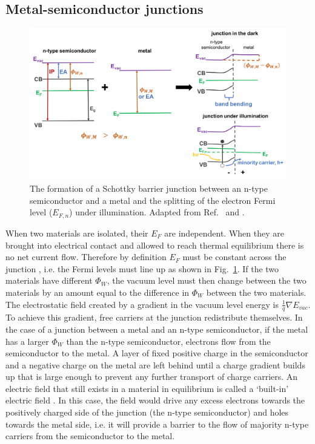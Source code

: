 \documentclass[11pt, twoside]{report}
\begin{document}
\subsection{Metal-semiconductor junctions}
\begin{figure}[h!]
  \centering
    \includegraphics[width=1.0\textwidth]{figures/schottky_schematic.png}
    \caption[The formation of a Schottky barrier junction between an n-type semiconductor and a metal and the splitting of the electron Fermi level ($E_{F,n}$) under illumination]{The formation of a Schottky barrier junction between an n-type semiconductor and a metal and the splitting of the electron Fermi level ($E_{F,n}$) under illumination. Adapted from Ref.~ and .}
  \label{schottky_schematic}
\end{figure}

When two materials are isolated, their $E_F$ are independent. When they are brought into electrical contact and allowed to reach thermal equilibrium there is no net current flow. Therefore by definition $E_F$ must be constant across the junction \cite{PV_bands_book}, i.e. the Fermi levels must line up as shown in Fig.~\ref{schottky_schematic}. 
If the two materials have different $\Phi_W$, the vacuum level must then change between the two materials by an amount equal to the difference in $\Phi_W$ between the two materials. The electrostatic field created by a gradient in the vacuum level energy is $\frac{1}{q} \nabla E_{vac}$.
To achieve this gradient, free carriers at the junction redistribute themselves. In the case of a junction between a metal and an n-type semiconductor, if the metal has a larger $\Phi_W$ than the n-type semiconductor, electrons flow from the semiconductor to the metal. A layer of fixed positive charge in the semiconductor and a negative charge on the metal are left behind until a charge gradient builds up that is large enough to prevent any further transport of charge carriers. An electric field that still exists in a material in equilibrium is called a `built-in' electric field \cite{Nelson5}. In this case, the field would drive any excess electrons towards the positively charged side of the junction (the n-type semiconductor) and holes towards the metal side, i.e. it will provide a barrier to the flow of majority n-type carriers from the semiconductor to the metal.
\end{document}
